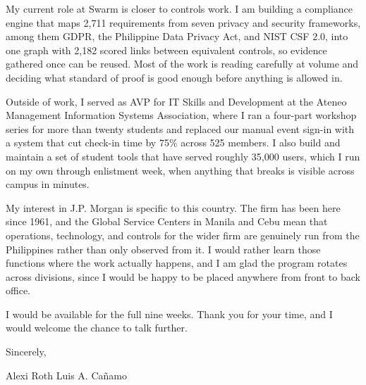 \documentclass[a4paper, 11pt]{article}
\newcommand{\para}{\vspace{0.6em}}
\begin{document}
My current role at Swarm is closer to controls work. I am building a compliance engine that maps 2,711 requirements from seven privacy and security frameworks, among them GDPR, the Philippine Data Privacy Act, and NIST CSF 2.0, into one graph with 2,182 scored links between equivalent controls, so evidence gathered once can be reused. Most of the work is reading carefully at volume and deciding what standard of proof is good enough before anything is allowed in.
\para

Outside of work, I served as AVP for IT Skills and Development at the Ateneo Management Information Systems Association, where I ran a four-part workshop series for more than twenty students and replaced our manual event sign-in with a system that cut check-in time by 75\% across 525 members. I also build and maintain a set of student tools that have served roughly 35,000 users, which I run on my own through enlistment week, when anything that breaks is visible across campus in minutes.
\para

My interest in J.P. Morgan is specific to this country. The firm has been here since 1961, and the Global Service Centers in Manila and Cebu mean that operations, technology, and controls for the wider firm are genuinely run from the Philippines rather than only observed from it. I would rather learn those functions where the work actually happens, and I am glad the program rotates across divisions, since I would be happy to be placed anywhere from front to back office.
\para

I would be available for the full nine weeks. Thank you for your time, and I would welcome the chance to talk further.
\para

Sincerely,

\vspace{0.9em}
Alexi Roth Luis A. Cañamo
\end{document}
